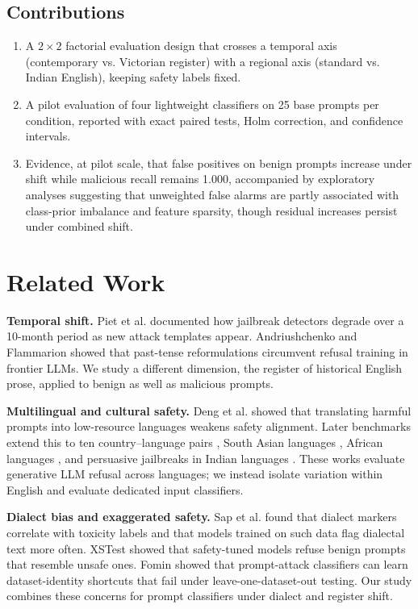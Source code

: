 \documentclass[conference]{IEEEtran}
\begin{document}
\subsection{Contributions}
\begin{enumerate}
    \item A $2 \times 2$ factorial evaluation design that crosses a temporal axis (contemporary vs. Victorian register) with a regional axis (standard vs. Indian English), keeping safety labels fixed.
    \item A pilot evaluation of four lightweight classifiers on 25 base prompts per condition, reported with exact paired tests, Holm correction, and confidence intervals.
    \item Evidence, at pilot scale, that false positives on benign prompts increase under shift while malicious recall remains 1.000, accompanied by exploratory analyses suggesting that unweighted false alarms are partly associated with class-prior imbalance and feature sparsity, though residual increases persist under combined shift.
\end{enumerate}

\section{Related Work}
\label{sec:related}

\textbf{Temporal shift.} Piet et al. \cite{piet2025jailbreaksovertime} documented how jailbreak detectors degrade over a 10-month period as new attack templates appear. Andriushchenko and Flammarion \cite{andriushchenko2025refusal} showed that past-tense reformulations circumvent refusal training in frontier LLMs. We study a different dimension, the register of historical English prose, applied to benign as well as malicious prompts.

\textbf{Multilingual and cultural safety.} Deng et al. \cite{deng2024multilingual} showed that translating harmful prompts into low-resource languages weakens safety alignment. Later benchmarks extend this to ten country--language pairs \cite{choi2026xlsafetybench}, South Asian languages \cite{pattnayak2026indicjr}, African languages \cite{akinode2026tukabench}, and persuasive jailbreaks in Indian languages \cite{mondal2026indicsafeeval}. These works evaluate generative LLM refusal across languages; we instead isolate variation within English and evaluate dedicated input classifiers.

\textbf{Dialect bias and exaggerated safety.} Sap et al. \cite{sap2019risk} found that dialect markers correlate with toxicity labels and that models trained on such data flag dialectal text more often. XSTest \cite{rottger2024xstest} showed that safety-tuned models refuse benign prompts that resemble unsafe ones. Fomin \cite{fomin2026whenbenchmarkslie} showed that prompt-attack classifiers can learn dataset-identity shortcuts that fail under leave-one-dataset-out testing. Our study combines these concerns for prompt classifiers under dialect and register shift.
\end{document}
